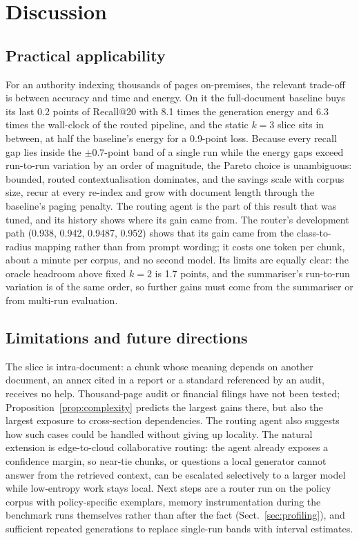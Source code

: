 \documentclass[pdflatex,sn-mathphys-num]{sn-jnl}
\makeatletter
\newcommand{\Rec}[1]{Recall@#1}
\theoremstyle{thmstyleone}%
\theoremstyle{thmstylethree}%
\makeatother
\begin{document}
\section{Discussion}\label{sec:discussion}

\subsection{Practical applicability}
For an authority indexing thousands of pages on-premises, the relevant trade-off is between accuracy and time and energy. On it the full-document baseline buys its last 0.2 points of \Rec{20} with 8.1 times the generation energy and 6.3 times the wall-clock of the routed pipeline, and the static $k=3$ slice sits in between, at half the baseline's energy for a 0.9-point loss. Because every recall gap lies inside the $\pm0.7$-point band of a single run while the energy gaps exceed run-to-run variation by an order of magnitude, the Pareto choice is unambiguous: bounded, routed contextualisation dominates, and the savings scale with corpus size, recur at every re-index and grow with document length through the baseline's paging penalty. The routing agent is the part of this result that was tuned, and its history shows where its gain came from. The router's development path (0.938, 0.942, 0.9487, 0.952) shows that its gain came from the class-to-radius mapping rather than from prompt wording; it costs one token per chunk, about a minute per corpus, and no second model. Its limits are equally clear: the oracle headroom above fixed $k=2$ is 1.7 points, and the summariser's run-to-run variation is of the same order, so further gains must come from the summariser or from multi-run evaluation.

\subsection{Limitations and future directions}
The slice is intra-document: a chunk whose meaning depends on another document, an annex cited in a report or a standard referenced by an audit, receives no help. Thousand-page audit or financial filings have not been tested; Proposition~\ref{prop:complexity} predicts the largest gains there, but also the largest exposure to cross-section dependencies. The routing agent also suggests how such cases could be handled without giving up locality. The natural extension is edge-to-cloud collaborative routing: the agent already exposes a confidence margin, so near-tie chunks, or questions a local generator cannot answer from the retrieved context, can be escalated selectively to a larger model while low-entropy work stays local. Next steps are a router run on the policy corpus with policy-specific exemplars, memory instrumentation during the benchmark runs themselves rather than after the fact (Sect.~\ref{sec:profiling}), and sufficient repeated generations to replace single-run bands with interval estimates.
\end{document}
